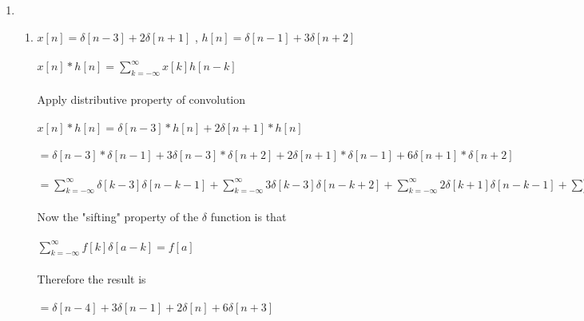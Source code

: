 \documentclass[10pt,a4paper, margin=1in]{article}
\begin{document}
\begin{enumerate}
\begin{enumerate}

    \end{enumerate}

\item %
    \begin{enumerate}
    \item %
    $x[n] =  \delta[n-3] + 2\delta[n+1]$ , $h[n] = \delta[n-1] +3\delta[n+2]$ \\ \\
    $x[n]*h[n] = \sum\limits_{k=-\infty}^{\infty} x[k]h[n-k]$ \\ \\
    Apply distributive property of convolution \\ \\
    $x[n]*h[n] = \delta[n-3]*h[n] + 2\delta[n+1]*h[n]$ \\ \\
    $= \delta[n-3]*\delta[n-1] + 3\delta[n-3]*\delta[n+2] + 2\delta[n+1]*\delta[n-1] + 6\delta[n+1]*\delta[n+2]$ \\ \\
    $= \sum\limits_{k=-\infty}^{\infty} \delta[k-3]\delta[n-k-1] +
    \sum\limits_{k=-\infty}^{\infty} 3\delta[k-3]\delta[n-k+2] +
    \sum\limits_{k=-\infty}^{\infty} 2\delta[k+1]\delta[n-k-1] +
    \sum\limits_{k=-\infty}^{\infty} 6\delta[k+1]\delta[n-k+2]$ \\ \\
    Now the "sifting" property of the $\delta$ function is that \\ \\
    $\sum\limits_{k=-\infty}^{\infty} f[k] \delta[a-k] = f[a]$ \\ \\
    Therefore the result is \\ \\
    $ = \delta[n-4] + 3\delta[n-1] +2\delta[n] + 6\delta[n+3]$ \\ \\



\end{enumerate}
\end{enumerate}
\end{document}
